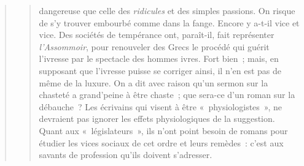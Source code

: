 \documentclass[french,twoside]{book} %
\begin{document}
\begin{verse}
\begin{verse}
dangereuse que celle des \emph{ridicules} et des simples passions. On risque de s’y trouver embourbé comme dans la fange. Encore y a-t-il vice et vice. Des sociétés de tempérance ont, paraît-il, fait représenter \emph{l’Assommoir}, pour renouveler des Grecs le procédé qui guérit l’ivresse par le spectacle des hommes ivres. Fort bien ; mais, en supposant que l’ivresse puisse se corriger ainsi, il n’en est pas de même de la luxure. On a dit avec raison qu’un sermon sur la chasteté a grand’peine à être chaste ; que sera-ce d’un roman sur la débauche ? Les écrivains qui visent à être « physiologistes », ne devraient pas ignorer les effets physiologiques de la suggestion. Quant aux « législateurs », ils n’ont point besoin de romans pour étudier les vices sociaux de cet ordre et leurs remèdes : c’est aux savants de profession qu’ils doivent s’adresser.\par

\end{verse}
\end{verse}
\end{document}
